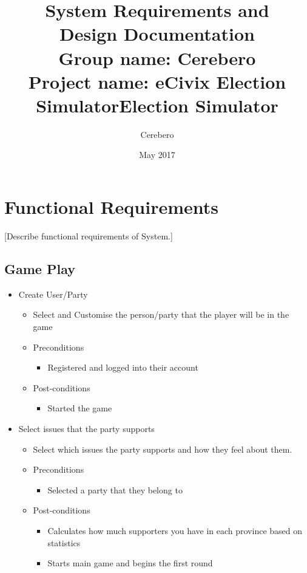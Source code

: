 \documentclass{article}
\title{\textbf{System Requirements and \\Design Documentation}\\
        \textbf{Group name:} Cerebero\\
       \textbf{ Project name:} eCivix Election Simulator}
\date{May 2017}
\author{Cerebero}
\title{Election Simulator}
\begin{document}
  
  \tableofcontents
  \newpage

  \section{Functional Requirements}
  [Describe functional requirements of System.]
   \subsection{Game Play}
   	\begin{itemize}
   		\item Create User/Party
			\begin{itemize}
				\item Select and Customise the person/party that the player will be in the game
				\item Preconditions
				\begin{itemize}
					\item Registered and logged into their account
				\end{itemize}
				\item Post-conditions
				\begin{itemize}
					\item Started the game
				\end{itemize}
			\end{itemize}
	\end{itemize}
	
	\begin{itemize}
   		\item Select issues that the party supports
			\begin{itemize}
				\item Select which issues the party supports and how they feel about them.
				\item Preconditions
				\begin{itemize}
					\item Selected a party that they belong to
				\end{itemize}
				\item Post-conditions
				\begin{itemize}
					\item Calculates how much supporters you have in each province based on statistics
					\item Starts main game and begins the first round
				\end{itemize}
			\end{itemize}
	\end{itemize}
	
\end{document}
